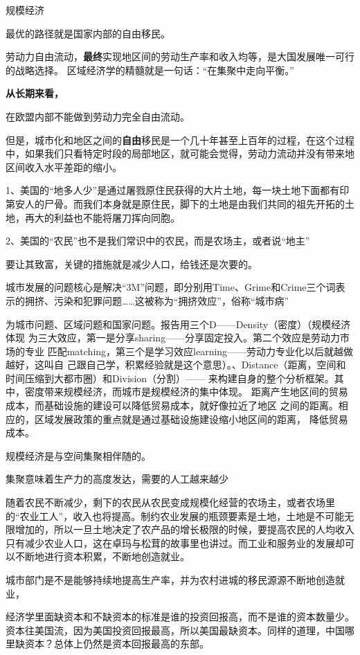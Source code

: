 规模经济

最优的路径就是国家内部的自由移民。

劳动力自由流动，{\bf 最终}实现地区间的劳动生产率和收入均等，是大国发展唯一可行的战略选择。
区域经济学的精髓就是一句话：“在集聚中走向平衡。”

{\bf 从长期来看，}

在欧盟内部不能做到劳动力完全自由流动。


但是，城市化和地区之间的{\bf 自由}移民是一个几十年甚至上百年的过程，在这个过程中，如果我们只看特定时段的局部地区，就可能会觉得，劳动力流动并没有带来地区间收入水平差距的缩小。

1、美国的“地多人少”是通过屠戮原住民获得的大片土地，每一块土地下面都有印第安人的尸骨。而我们本身就是原住民，脚下的土地是由我们共同的祖先开拓的土地，再大的利益也不能将屠刀挥向同胞。

2、美国的“农民”也不是我们常识中的农民，而是农场主，或者说“地主”

要让其致富，关键的措施就是减少人口，给钱还是次要的。

城市发展的问题核心是解决“3M”问题，即分别用Time、Grime和Crime三个词表示的拥挤、污染和犯罪问题……这被称为“拥挤效应”，俗称“城市病”

为城市问题、区域问题和国家问题。报告用三个D——Density（密度）（规模经济体现
为三大效应，第一是分享sharing——分享固定投入。第二个效应是劳动力市场的专业
匹配matching，第三个是学习效应learning——劳动力专业化以后就越做越好，这叫自
己跟自己学，积累经验就是这个意思）。、Distance（距离，空间和时间压缩到大都市圈）和Division（分割）——
来构建自身的整个分析框架。其中，密度带来规模经济，而城市是规模经济的集中体现。
距离产生地区间的贸易成本，而基础设施的建设可以降低贸易成本，就好像拉近了地区
之间的距离。相应的，区域发展政策的重点就是通过基础设施建设缩小地区间的距离，
降低贸易成本。

规模经济是与空间集聚相伴随的。

集聚意味着生产力的高度发达，需要的人工越来越少

随着农民不断减少，剩下的农民从农民变成规模化经营的农场主，或者农场里的“农业工人”，收入也将提高。制约农业发展的瓶颈要素是土地，土地是不可能无限增加的，所以一旦土地决定了农产品的增长极限的时候，要提高农民的人均收入只有减少农业人口，这在卓玛与松茸的故事里也讲过。而工业和服务业的发展却可以不断地进行资本积累，不断地创造就业。

城市部门是不是能够持续地提高生产率，并为农村进城的移民源源不断地创造就业，

经济学里面缺资本和不缺资本的标准是谁的投资回报高，而不是谁的资本数量少。资本往美国流，因为美国投资回报最高，所以美国最缺资本。同样的道理，中国哪里缺资本？总体上仍然是资本回报最高的东部。

